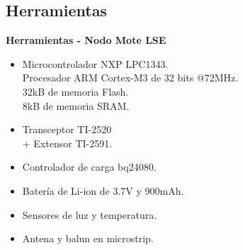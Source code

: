 \documentclass[aspectratio=43, handout]{beamer}
\begin{document}
\subsection[Herramientas]{Herramientas}
\begin{frame}{\textbf{\LARGE{Herramientas - Nodo Mote LSE}}}

\begin{minipage}[c]{1.0\linewidth}
	\begin{minipage}[c]{0.6\linewidth}
\begin{itemize}
\item Microcontrolador NXP LPC1343.\\
Procesador ARM Cortex-M3 de 32 bits @72MHz.\\
32kB de memoria Flash.\\
8kB de memoria SRAM.\\
\item Transceptor TI-2520\\+ Extensor TI-2591.
\item Controlador de carga bq24080.
\item Batería de Li-ion de 3.7V y 900mAh.
\item Sensores de luz y temperatura.
\item Antena y balun en microstrip.
\end{itemize}
	\end{minipage}
	\begin{minipage}[c]{0.35\linewidth}
		\begin{figure}[H]
			\vspace{35px}

\end{figure}
\end{minipage}
\end{minipage}
\end{frame}
\end{document}
